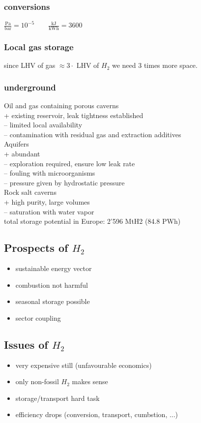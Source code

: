 \documentclass[a4paper,10pt,landscape]{scrartcl}
\begin{document}
\begin{multicols*}{3}
\subsubsection{conversions}
$\frac{\mathrm{Pa}}{\mathrm{bar}}=10^{-5} \quad\quad \mathrm{\frac{kJ}{kWh}}=3600$

\subsubsection{Local gas storage}
since LHV of gas $\approx 3\cdot$ LHV of $H_2$ we need 3 times more space.

\subsubsection{underground}
Oil and gas containing porous caverns \\
+ existing reservoir, leak tightness established \\
– limited local availability \\
– contamination with residual gas and extraction additives \\
Aquifers \\
+ abundant \\
– exploration required, ensure low leak rate \\
– fouling with microorganisms \\
– pressure given by hydrostatic pressure \\
Rock salt caverns \\ 
+ high purity, large volumes \\
– saturation with water vapor \\
total storage potential in Europe: 2’596 MtH2 (84.8 PWh)

\subsection{Prospects of $H_2$}
\begin{itemize}
    \item sustainable energy vector
    \item combustion not harmful
    \item seasonal storage possible
    \item sector coupling
\end{itemize}
\subsection{Issues of $H_2$}
\begin{itemize}
    \item very expensive still (unfavourable economics)
    \item only non-fossil $H_2$ makes sense
    \item storage/transport hard task
    \item efficiency drops (conversion, transport, cumbstion, ...)
\end{itemize}

\end{multicols*}
\end{document}
